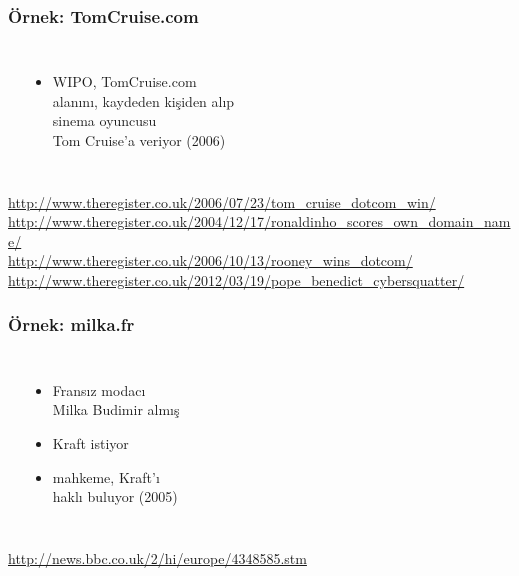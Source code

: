 \documentclass[dvipsnames]{beamer}
\theoremstyle{definition}
\theoremstyle{example}
\theoremstyle{plain}
\begin{document}
\begin{frame}
  \frametitle{Örnek: TomCruise.com}

  \begin{columns}
    \begin{center}
    \end{center}

    \begin{itemize}
      \item WIPO, TomCruise.com\\
        alanını, kaydeden kişiden alıp\\
        sinema oyuncusu\\
        Tom Cruise'a veriyor (2006)
    \end{itemize}
  \end{columns}

  \medskip
  \tiny{\url{http://www.theregister.co.uk/2006/07/23/tom_cruise_dotcom_win/}}\\
  \tiny{\url{http://www.theregister.co.uk/2004/12/17/ronaldinho_scores_own_domain_name/}}\\
  \tiny{\url{http://www.theregister.co.uk/2006/10/13/rooney_wins_dotcom/}}\\
  \tiny{\url{http://www.theregister.co.uk/2012/03/19/pope_benedict_cybersquatter/}}\\
\end{frame}

\begin{frame}
  \frametitle{Örnek: milka.fr}

  \begin{columns}
    \begin{center}
    \end{center}

    \begin{itemize}
      \item Fransız modacı\\
        Milka Budimir almış
      \item Kraft istiyor
      \item mahkeme, Kraft'ı\\
        haklı buluyor (2005)
    \end{itemize}
  \end{columns}

  \medskip
  \tiny{\url{http://news.bbc.co.uk/2/hi/europe/4348585.stm}}\\
\end{frame}
\end{document}

